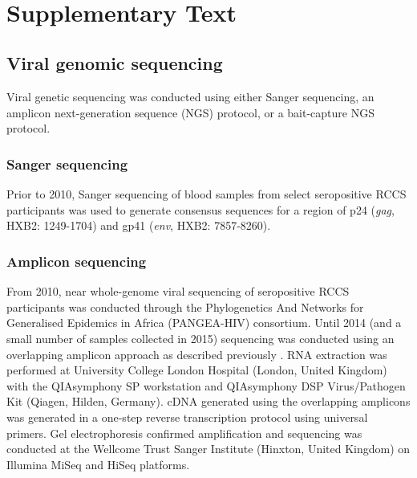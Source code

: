 \documentclass{article}[11pt]
\renewcommand{\thefigure}{\textbf{\arabic{figure}}}
\renewcommand{\thetable}{\textbf{\arabic{table}}}
\begin{document}
\renewcommand{\thetable}{\textbf{S\arabic{table}}}
\setcounter{table}{0}

\renewcommand{\thefigure}{\textbf{S\arabic{figure}}}
\setcounter{figure}{0}

\begin{center}
    \Large \thetitle \\
   \section*{Supplementary Text}
\end{center}


\label{sec:supp_text}

\subsection*{Viral genomic sequencing}
Viral genetic sequencing was conducted using either Sanger sequencing, an amplicon next-generation sequence (NGS) protocol, or a bait-capture NGS protocol. 

\subsubsection*{Sanger sequencing}
Prior to 2010, Sanger sequencing of blood samples from select seropositive RCCS participants was used to generate consensus sequences for a region of p24 (\textit{gag}, HXB2: 1249-1704) and gp41 (\textit{env}, HXB2: 7857-8260).

\subsubsection*{Amplicon sequencing}
From 2010, near whole-genome viral sequencing of seropositive RCCS participants was conducted through the Phylogenetics And Networks for Generalised Epidemics in Africa (PANGEA-HIV) consortium. Until 2014 (and a small number of samples collected in 2015) sequencing was conducted using an overlapping amplicon approach as described previously \cite{gall2012}. RNA extraction was performed at University College London Hospital (London, United Kingdom) with the QIAsymphony SP workstation and QIAsymphony DSP Virus/Pathogen Kit (Qiagen, Hilden, Germany). cDNA generated using the overlapping amplicons was generated in a one-step reverse transcription protocol using universal primers. Gel electrophoresis confirmed amplification and sequencing was conducted at the Wellcome Trust Sanger Institute (Hinxton, United Kingdom) on Illumina MiSeq and HiSeq platforms. 
\end{document}
